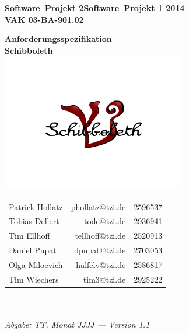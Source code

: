 \documentclass[fontsize=12pt,paper=a4,twoside]{scrartcl}
\newcommand{\swp}[0]{\ifthenelse{\boolean{langversion}}%
{Software--Projekt 2}{Software--Projekt 1}}
\newcommand{\jahr}[0]{2014}
\begin{document}
  \thispagestyle{fancy}
  \fancyhead[LO,RE]{ }
  \fancyfoot[C]{}

  \vspace{3cm}

  \begin{minipage}[H]{\textwidth}
  \begin{center}
  \bf
  \Large
  \swp{} \jahr\\
  \smallskip
  \small
  VAK 03-BA-901.02\\
  \vspace{3cm}
  \end{center}
  \end{minipage}
  \begin{minipage}[H]{\textwidth}
  \begin{center}
  \vspace{1cm}
  \bf
  {\Large Anforderungsspezifikation}\\
  \vspace{3ex}
  Schibboleth\\
  \includegraphics[width=0.6\textwidth]{Bilder/Logo.png}
  \vfill
  \end{center}
  \end{minipage}
  \vfill
  \begin{minipage}[H]{\textwidth}
  \begin{center}
  \sf
  \begin{tabular}{lrr}
  Patrick Hollatz & phollatz@tzi.de & 2596537 \\
  Tobias Dellert & tode@tzi.de & 2936941 \\
  Tim Ellhoff & tellhoff@tzi.de & 2520913\\
  Daniel Pupat & dpupat@tzi.de & 2703053 \\
  Olga Miloevich & halfelv@tzi.de  & 2586817\\  
  Tim Wiechers & tim3@tzi.de & 2925222 \\
  \end{tabular}
  \\ ~
  \vspace{2cm}
  \\
  \it Abgabe: TT. Monat JJJJ --- Version 1.1\\ ~
  \end{center}
  \end{minipage}
\end{document}
